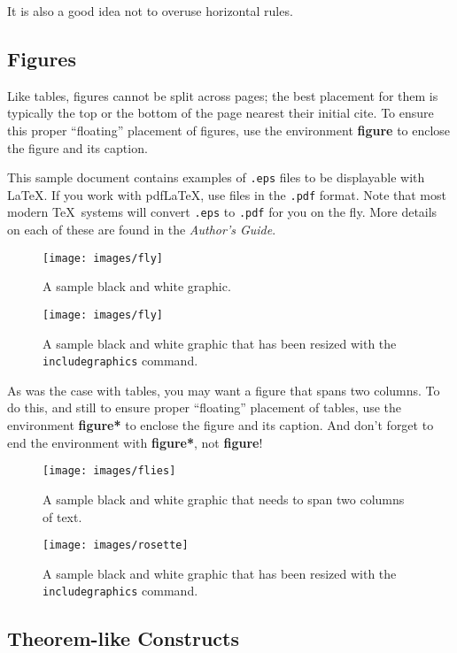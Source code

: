 \documentclass[sigconf]{acmart}
\begin{document}
It is also a good idea not to overuse horizontal rules.


\subsection{Figures}

Like tables, figures cannot be split across pages; the best placement
for them is typically the top or the bottom of the page nearest their
initial cite.  To ensure this proper ``floating'' placement of
figures, use the environment \textbf{figure} to enclose the figure and
its caption.

This sample document contains examples of \texttt{.eps} files to be
displayable with \LaTeX.  If you work with pdf\LaTeX, use files in the
\texttt{.pdf} format.  Note that most modern \TeX\ systems will convert
\texttt{.eps} to \texttt{.pdf} for you on the fly.  More details on
each of these are found in the \textit{Author's Guide}.

\begin{figure}
\texttt{[image: images/fly]}
\caption{A sample black and white graphic.}
\end{figure}

\begin{figure}
\texttt{[image: images/fly]}
\caption{A sample black and white graphic
that has been resized with the \texttt{includegraphics} command.}
\end{figure}


As was the case with tables, you may want a figure that spans two
columns.  To do this, and still to ensure proper ``floating''
placement of tables, use the environment \textbf{figure*} to enclose
the figure and its caption.  And don't forget to end the environment
with \textbf{figure*}, not \textbf{figure}!

\begin{figure*}
\texttt{[image: images/flies]}
\caption{A sample black and white graphic
that needs to span two columns of text.}
\end{figure*}


\begin{figure}
\texttt{[image: images/rosette]}
\caption{A sample black and white graphic that has
been resized with the \texttt{includegraphics} command.}
\end{figure}

\subsection{Theorem-like Constructs}
\end{document}

